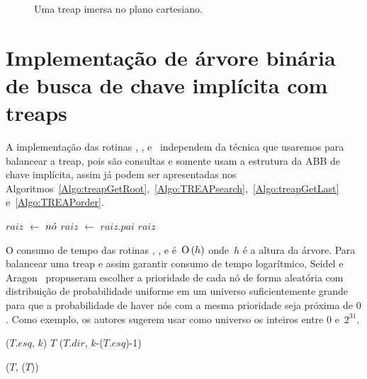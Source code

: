 \begin{figure}[htb]
\centering

\caption{Uma treap imersa no plano cartesiano.}
\label{fig:TREAP}
\end{figure}

\section{Implementação de árvore binária de busca de chave implícita com treaps}
\label{sec:imple-treap}
A implementação das rotinas \treapGetRoot{}, \treapSearch{}, \treapOrder{} e~\treapGetLast{} independem da técnica que usaremos para balancear a treap, pois são consultas e somente usam a estrutura da ABB de chave implícita, assim já podem ser apresentadas nos Algoritmos~\ref{Algo:treapGetRoot},~\ref{Algo:TREAPsearch},~\ref{Algo:treapGetLast} e~\ref{Algo:TREAPorder}.

\begin{algorithm}[htb]
\caption{\treapGetRoot($\node$)}
\label{Algo:treapGetRoot}
\begin{algorithmic}[1]
\State $raiz$ $\gets$ $\node$
\State  $raiz$ $\gets$  $raiz$.$pai$
\EndWhile
\State \Return $raiz$
\end{algorithmic}
\end{algorithm}

O consumo de tempo das rotinas \treapGetRoot{}, \treapSearch{}, \treapGetLast{} e \treapOrder{} é~$\text{O}\left(h\right)$ onde~$h$ é a altura da árvore. Para balancear uma treap e assim garantir consumo de tempo logarítmico, Seidel e Aragon~\cite{AragonSeidel1996} propuseram escolher a prioridade de cada nó de forma aleatória com distribuição de probabilidade uniforme em um universo suficientemente grande para que a probabilidade de haver nós com a mesma prioridade seja próxima de $0$. Como exemplo, os autores sugerem usar como universo os inteiros entre $0$ e~$2^{31}$.

\begin{algorithm}
\caption{\treapSearch($T$, $k$)}
\label{Algo:TREAPsearch}
\begin{algorithmic}[1]
\State \Return \treapSearch($T$.$esq$, $k$)
\EndIf
\State \Return $T$
\EndIf
\State \Return \treapSearch($T.dir$, $k$-\treapGetSize($T$.$esq$)-1)
\end{algorithmic}
\end{algorithm}

\begin{algorithm}
\caption{\treapGetLast($T$)}
\label{Algo:treapGetLast}
\begin{algorithmic}[1]
\State \Return \treapSearch($T$, \treapGetSize($T$))
\end{algorithmic}
\end{algorithm}

